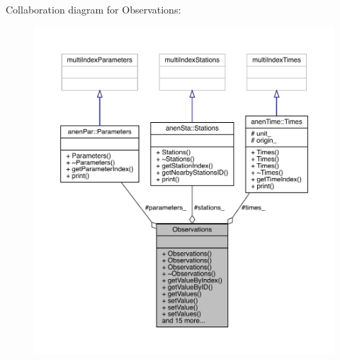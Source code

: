Collaboration diagram for Observations\+:\nopagebreak
\begin{figure}[H]
\begin{center}
\leavevmode
\includegraphics[width=350pt]{class_observations__coll__graph}
\end{center}
\end{figure}
